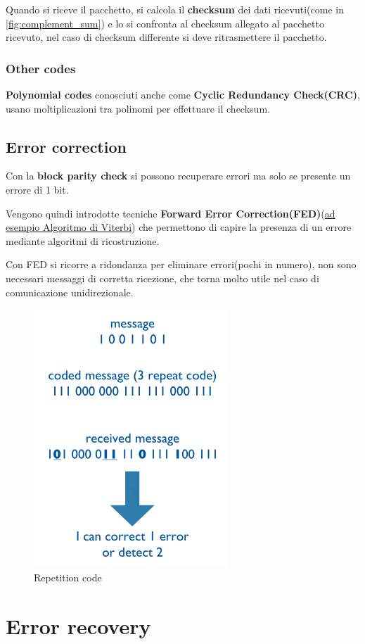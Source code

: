 Quando si riceve il pacchetto, si calcola il \textbf{checksum} dei dati ricevuti(come in \autoref{fig:complement_sum})
e lo si confronta al checksum allegato al pacchetto ricevuto,
nel caso di checksum differente si deve ritrasmettere il pacchetto.

\subsubsection{Other codes}

\textbf{Polynomial codes} conosciuti anche come \textbf{Cyclic Redundancy Check(CRC)},
usano moltiplicazioni tra polinomi per effettuare il checksum.

\subsection{Error correction}
Con la \textbf{block parity check} si possono recuperare errori ma solo se presente un errore di 1 bit.

Vengono quindi introdotte tecniche \textbf{Forward Error Correction(FED)}(\href{https://en.wikipedia.org/wiki/Viterbi_algorithm}{ad esempio Algoritmo di Viterbi})
che permettono di capire la presenza di un errore mediante algoritmi di ricostruzione.

Con FED si ricorre a ridondanza per eliminare errori(pochi in numero), non sono necessari messaggi
di corretta ricezione, che torna molto utile nel caso di comunicazione unidirezionale.


\begin{figure}[!ht]
	\centering
	\includegraphics[width=0.3\columnwidth]{./images/repetition_code.png}
	\caption{Repetition code}
	\label{fig_repetition_code}
\end{figure}

\section{Error recovery}

